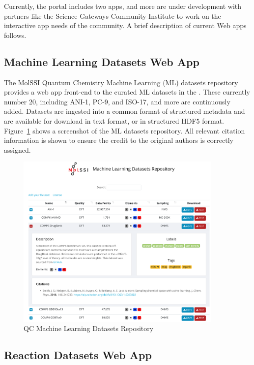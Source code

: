 \documentclass[journal=jctcce,manuscript=article]{achemso}
\newcommand{\qcaN}{QCArchive}
\newcommand{\qca}{{\sc{\qcaN}}\xspace}%
\newcommand{\mqcas}{{\sc{mqcas}}\xspace}%
\begin{document}
Currently, the \qca portal includes two apps, and more are under development with partners like the Science Gateways Community Institute\cite{SGCI} to work on the interactive app needs of the community. A brief description of current Web apps follows.


\subsection{Machine Learning Datasets Web App\label{sec:mlapp}}

The MolSSI Quantum Chemistry Machine Learning (ML) datasets repository provides a web app front-end to the curated ML datasets in the \mqcas.
These currently number 20, including ANI-1,\cite{Smith:2017:3192, Smith:2017:170193}
PC-9,\cite{Nakata:2017:1300, Glavatskikh:2019:69} and
ISO-17,\cite{Ramakrishnan:2014:140022, Schutt:2017:13890, Schutt:2017:991} and more are continuously added.
Datasets are ingested into a common format of structured metadata and are available for download in text format, or in structured HDF5 format.
Figure~\ref{fig:apps_ml_datasets} shows a screenshot of the ML datasets repository. 
All relevant citation information is shown to ensure the credit to the original authors is correctly assigned.

\begin{figure}[H]
\includegraphics[width=0.9\textwidth]{./images/apps_ml_datasets.png}
\centering
\caption{QC Machine Learning Datasets Repository}
\label{fig:apps_ml_datasets}
\end{figure}


\subsection{Reaction Datasets Web App\label{sec:dbapp}}
\end{document}
